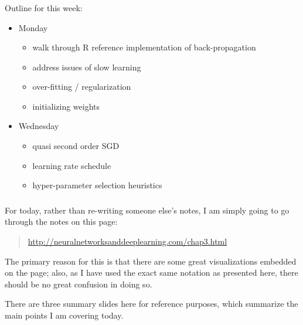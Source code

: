 \documentclass[xetex,mathserif,serif,aspectratio=169]{beamer}
\begin{document}
\begin{frame}[fragile] \frametitle{} \oldB \small

Outline for this week:
\begin{itemize}
\item Monday
\begin{itemize}
\item walk through R reference implementation of back-propagation
\item address issues of slow learning
\item over-fitting / regularization
\item initializing weights
\end{itemize}
\item Wednesday
\begin{itemize}
\item quasi second order SGD
\item learning rate schedule
\item hyper-parameter selection heuristics
\end{itemize}
\end{itemize}

\end{frame}

\begin{frame}[fragile] \frametitle{} \oldB \small

\textbf{}

For today, rather than re-writing someone else's notes, I am
simply going to go through the notes on this page:
\begin{quote}
\url{http://neuralnetworksanddeeplearning.com/chap3.html}
\end{quote}
The primary reason for this is that there are some great
visualizations embedded on the page; also, as I have used the
exact same notation as presented here, there should be no great
confusion in doing so.

There are three summary slides here for reference purposes, which
summarize the main points I am covering today.

\end{frame}
\end{document}
